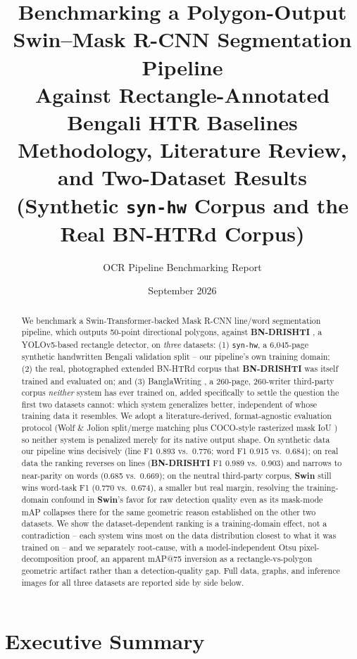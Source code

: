 \documentclass[11pt]{article}
\title{\textbf{Benchmarking a Polygon-Output Swin--Mask R-CNN Segmentation Pipeline\\
Against Rectangle-Annotated Bengali HTR Baselines}\\[4pt]
\large Methodology, Literature Review, and Two-Dataset Results\\[2pt]
\normalsize (Synthetic \texttt{syn-hw} Corpus and the Real BN-HTRd Corpus)}
\author{OCR Pipeline Benchmarking Report}
\date{September 2026}
\newcommand{\swin}{\textbf{Swin}}
\newcommand{\bnd}{\textbf{BN-DRISHTI}}
\begin{document}
\maketitle

\begin{abstract}
\noindent We benchmark a Swin-Transformer-backed Mask R-CNN line/word segmentation
pipeline, which outputs 50-point directional polygons, against \bnd{}
\cite{jubaer2023bndrishti}, a YOLOv5-based rectangle detector, on \emph{three}
datasets: (1) \texttt{syn-hw}, a 6{,}045-page synthetic handwritten Bengali validation
split -- our pipeline's own training domain; (2) the real, photographed extended
BN-HTRd corpus \cite{rahman2022bnhtrd} that \bnd{} was itself trained and evaluated
on; and (3) BanglaWriting \cite{mridha2021banglawriting}, a 260-page, 260-writer
third-party corpus \emph{neither} system has ever trained on, added specifically to
settle the question the first two datasets cannot: which system generalizes better,
independent of whose training data it resembles. We adopt a literature-derived,
format-agnostic evaluation protocol (Wolf \& Jolion split/merge matching
\cite{wolf2006detEval} plus COCO-style rasterized mask IoU \cite{lin2014coco}) so
neither system is penalized merely for its native output shape. On synthetic data our
pipeline wins decisively (line F1 0.893 vs.\ 0.776; word F1 0.915 vs.\ 0.684); on real
data the ranking reverses on lines (\bnd{} F1 0.989 vs.\ 0.903) and narrows to
near-parity on words (0.685 vs.\ 0.669); on the neutral third-party corpus, \swin{}
still wins word-task F1 (0.770 vs.\ 0.674), a smaller but real margin, resolving the
training-domain confound in \swin's favor for raw detection quality even as its
mask-mode mAP collapses there for the same geometric reason established on the other
two datasets. We show the dataset-dependent ranking is a training-domain effect, not a
contradiction -- each system wins most on the data distribution closest to what it was
trained on -- and we separately root-cause, with a model-independent Otsu
pixel-decomposition proof, an apparent mAP@75 inversion as a rectangle-vs-polygon
geometric artifact rather than a detection-quality gap. Full data, graphs, and
inference images for all three datasets are reported side by side below.
\end{abstract}

\tableofcontents
\newpage

\section{Executive Summary}
\label{sec:execsummary}
\end{document}

